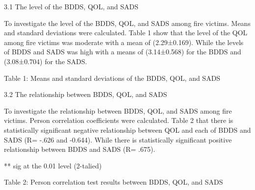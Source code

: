 \documentclass[10pt]{NSP1}
\begin{document}
3.1 The level of the BDDS, QOL, and SADS

To investigate the level of the BDDS, QOL, and SADS among fire victims. Means and standard deviations were calculated. Table 1 show that the level of the QOL among fire victims was moderate with a mean of (2.29±0.169). While the levels of BDDS and SADS was high with a means of (3.14±0.568) for the BDDS and (3.08±0.704) for the SADS.

\begin{table}[htbp]
\centering
{}
\caption{}

\end{table}

Table 1: Means and standard deviations of the BDDS, QOL, and SADS

3.2 The relationship between BDDS, QOL, and SADS

To investigate the relationship between BDDS, QOL, and SADS among fire victims. Person correlation coefficients were calculated. Table 2 that there is statistically significant negative relationship between QOL and each of BDDS and SADS (R= -.626 and -0.644). While there is statistically significant positive relationship between BDDS and SADS (R= .675).

\begin{table}[htbp]
\centering
{}
\caption{}

\end{table}

** sig at the 0.01 level (2-talied)

Table 2: Person correlation test results between BDDS, QOL, and SADS
\end{document}
